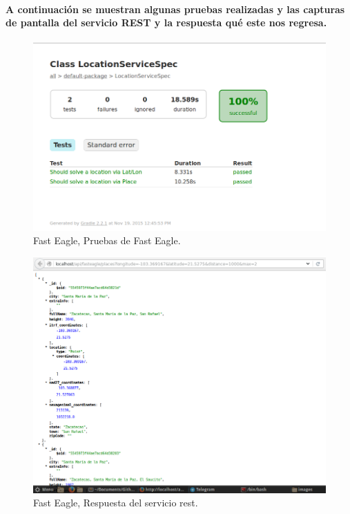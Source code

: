         \paragraph{A continuación se muestran algunas pruebas realizadas y las capturas de pantalla del servicio REST y la respuesta qué este nos regresa.}
        \begin{figure}[h!]
          \centering
            \includegraphics[width=\textwidth]{./images/PruebasFastEagle}
            \caption{Fast Eagle, Pruebas de Fast Eagle.}
        \end{figure}
        \begin{figure}[h!]
          \centering
            \includegraphics[width=\textwidth]{./images/CapturaFastEagle}
            \caption{Fast Eagle, Respuesta del servicio rest.}
        \end{figure}
